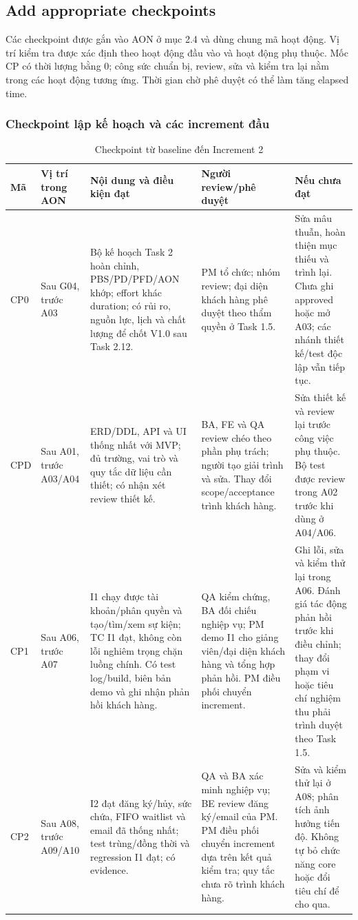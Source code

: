 \documentclass{article}
\begin{document}
\clearpage
{}
\begin{landscape}
\subsection{Add appropriate checkpoints}
Các checkpoint được gắn vào AON ở mục 2.4 và dùng chung mã hoạt động. Vị trí kiểm tra được xác định theo hoạt động đầu vào và hoạt động phụ thuộc. Mốc CP có thời lượng bằng 0; công sức chuẩn bị, review, sửa và kiểm tra lại nằm trong các hoạt động tương ứng. Thời gian chờ phê duyệt có thể làm tăng elapsed time.
\subsubsection{Checkpoint lập kế hoạch và các increment đầu}
\begin{table}[H]
\centering
\caption{Checkpoint từ baseline đến Increment 2}
\small
\renewcommand{\arraystretch}{1.3}
\begin{tabularx}{\linewidth}{|p{1cm}|p{3.1cm}|>{\raggedright\arraybackslash}X|p{5cm}|p{5.5cm}|}
\hline
\textbf{Mã} & \textbf{Vị trí trong AON} & \textbf{Nội dung và điều kiện đạt} & \textbf{Người review/phê duyệt} & \textbf{Nếu chưa đạt} \\ \hline
CP0 & Sau G04, trước A03 & Bộ kế hoạch Task 2 hoàn chỉnh, PBS/PD/PFD/AON khớp; effort khác duration; có rủi ro, nguồn lực, lịch và chất lượng để chốt V1.0 sau Task 2.12. & PM tổ chức; nhóm review; đại diện khách hàng phê duyệt theo thẩm quyền ở Task 1.5. & Sửa mâu thuẫn, hoàn thiện mục thiếu và trình lại. Chưa ghi approved hoặc mở A03; các nhánh thiết kế/test độc lập vẫn tiếp tục. \\ \hline
CPD & Sau A01, trước A03/A04 & ERD/DDL, API và UI thống nhất với MVP; đủ trường, vai trò và quy tắc dữ liệu cần thiết; có nhận xét review thiết kế. & BA, FE và QA review chéo theo phần phụ trách; người tạo giải trình và sửa. Thay đổi scope/acceptance trình khách hàng. & Sửa thiết kế và review lại trước công việc phụ thuộc. Bộ test được review trong A02 trước khi dùng ở A04/A06. \\ \hline
CP1 & Sau A06, trước A07 & I1 chạy được tài khoản/phân quyền và tạo/tìm/xem sự kiện; TC I1 đạt, không còn lỗi nghiêm trọng chặn luồng chính. Có test log/build, biên bản demo và ghi nhận phản hồi khách hàng. & QA kiểm chứng, BA đối chiếu nghiệp vụ; PM demo I1 cho giảng viên/đại diện khách hàng và tổng hợp phản hồi. PM điều phối chuyển increment. & Ghi lỗi, sửa và kiểm thử lại trong A06. Đánh giá tác động phản hồi trước khi điều chỉnh; thay đổi phạm vi hoặc tiêu chí nghiệm thu phải trình duyệt theo Task 1.5. \\ \hline
CP2 & Sau A08, trước A09/A10 & I2 đạt đăng ký/hủy, sức chứa, FIFO waitlist và email đã thống nhất; test trùng/đồng thời và regression I1 đạt; có evidence. & QA và BA xác minh nghiệp vụ; BE review đăng ký/email của PM. PM điều phối chuyển increment dựa trên kết quả kiểm tra; quy tắc chưa rõ trình khách hàng. & Sửa và kiểm thử lại ở A08; phân tích ảnh hưởng tiến độ. Không tự bỏ chức năng core hoặc đổi tiêu chí để cho qua. \\ \hline
\end{tabularx}
\end{table}


\end{landscape}
\end{document}
